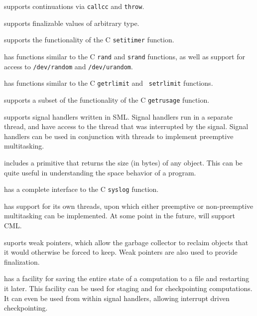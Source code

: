 \begin{description}
\begin{description}
{\mlton} supports continuations via {\tt callcc} and {\tt throw}.

{\mlton} supports finalizable values of arbitrary type.

{\mlton} supports the functionality of the C {\tt setitimer} function.

{\mlton} has functions similar to the C {\tt rand} and {\tt srand} functions, as
well as support for access to {\tt /dev/random} and {\tt /dev/urandom}.

{\mlton} has functions similar to the C {\tt getrlimit} and {\tt
setrlimit} functions.

{\mlton} supports a subset of the functionality of the C {\tt getrusage}
function.

{\mlton} supports signal handlers written in SML.  Signal handlers run
in a separate {\mlton} thread, and have access to the thread that was
interrupted by the signal.  Signal handlers can be used in conjunction
with threads to implement preemptive multitasking.

{\mlton} includes a primitive that returns the size (in bytes) of any
object.  This can be quite useful in understanding the space behavior
of a program.

{\mlton} has a complete interface to the C {\tt syslog} function.

{\mlton} has support for its own threads, upon which either preemptive
or non-preemptive multitasking can be implemented.  At some point in
the future, {\mlton} will support CML.

{\mlton} suports weak pointers, which allow the garbage collector to
reclaim objects that it would otherwise be forced to keep.  Weak
pointers are also used to provide finalization.

{\mlton} has a facility for saving the entire state of a computation
to a file and restarting it later.  This facility can be used for
staging and for checkpointing computations.  It can even be used from
within signal handlers, allowing interrupt driven checkpointing.

\end{description}
\end{description}

